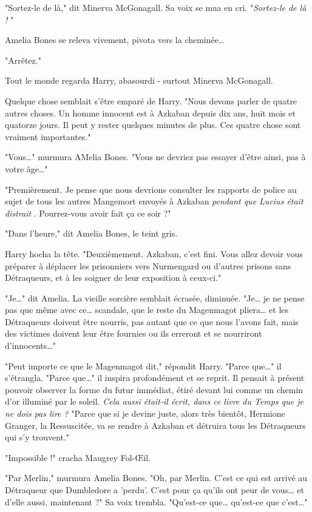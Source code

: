 "Sortez-le de là," dit Minerva McGonagall. Sa voix se mua en cri. "\emph{Sortez-le de là !} "

Amelia Bones se releva vivement, pivota vers la cheminée…

"Arrêtez."

Tout le monde regarda Harry, abasourdi - surtout Minerva McGonagall.

Quelque chose semblait s'être emparé de Harry. "Nous devons parler de quatre autres choses. Un homme innocent est à Azkaban depuis dix ans, huit mois et quatorze jours. Il peut y rester quelques minutes de plus. Ces quatre chose sont vraiment importantes."

"Vous…" murmura AMelia Bones. "Vous ne devriez pas essayer d'être ainsi, pas à votre âge…"

"Premièrement. Je pense que nous devrions consulter les rapports de police au sujet de tous les autres Mangemort envoyés à Azkaban \emph{pendant que Lucius était distrait} . Pourrez-vous avoir fait ça ce soir ?"

"Dans l'heure," dit Amelia Bones, le teint gris.

Harry hocha la tête. "Deuxièmement. Azkaban, c'est fini. Vous allez devoir vous préparer à déplacer les prisonniers vers Nurmengard ou d'autres prisons sans Détraqueurs, et à les soigner de leur exposition à ceux-ci."

"Je…" dit Amelia. La vieille sorcière semblait écrasée, diminuée. "Je… je ne pense pas que même avec ce… scandale, que le reste du Magenmagot pliera… et les Détraqueurs doivent être nourris, pas autant que ce que nous l'avons fait, mais des victimes doivent leur être fournies ou ils erreront et se nourriront d'innocents…"

"Peut importe ce que le Magenmagot dit," répondit Harry. "Parce que…" il s'étrangla. "Parce que…" il inspira profondément et se reprit. Il pensait à présent pouvoir observer la forme du futur immédiat, étiré devant lui comme un chemin d'or illuminé par le soleil. \emph{Cela aussi était-il écrit, dans ce livre du Temps que je ne dois pas lire ?}  "Parce que si je devine juste, alors très bientôt, Hermione Granger, la Ressuscitée, va se rendre à Azkaban et détruira tous les Détraqueurs qui s'y trouvent."

"Impossible !" cracha Maugrey Fol-Œil.

"Par Merlin," murmura Amelia Bones. "Oh, par Merlin. C'est ce qui est arrivé au Détraqueur que Dumbledore a 'perdu'. C'est pour ça qu'ils ont peur de vous… et d'elle aussi, maintenant ?" Sa voix trembla. "Qu'est-ce que… qu'est-ce que c'est…"

